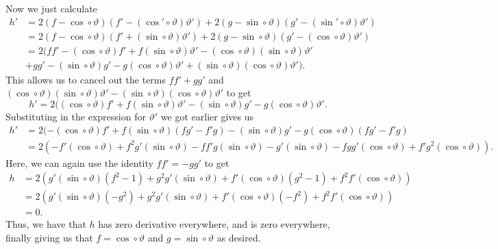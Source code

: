 \documentclass[12 pt, letterpaper]{hmcpset}
\begin{document}
\begin{solution}
	Now we just calculate
	\[
		\begin{split}
			h' & = 2 (f - \cos \circ \vartheta)(f' - (\cos' \circ \vartheta) \vartheta') + 2(g - \sin \circ \vartheta)(g' - (\sin' \circ \vartheta) \vartheta') \\
			   & = 2 (f - \cos \circ \vartheta)(f' + (\sin \circ \vartheta) \vartheta') + 2(g - \sin \circ \vartheta)(g' - (\cos \circ \vartheta) \vartheta') \\
			   & = 2 (f f' - (\cos \circ \vartheta) f' + f (\sin \circ \vartheta) \vartheta' - (\cos \circ \vartheta) (\sin \circ \vartheta) \vartheta' \\ 
			   & + g g' - (\sin \circ \vartheta) g' - g (\cos \circ \vartheta) \vartheta' + (\sin \circ \vartheta) (\cos \circ \vartheta) \vartheta').
		\end{split}
	\]
	This allows us to cancel out the terms $f f' + g g'$ and $(\cos \circ \vartheta) (\sin \circ \vartheta) \vartheta' - (\sin \circ \vartheta) (\cos \circ \vartheta) \vartheta'$ to get
	\[
		h' = 2 ((\cos \circ \vartheta) f' + f (\sin \circ \vartheta) \vartheta' - (\sin \circ \vartheta) g' - g (\cos \circ \vartheta) \vartheta'.
	\]
	Substituting in the expression for $\vartheta'$ we got earlier gives us
	\[
		\begin{split}
			h' & = 2 (-(\cos \circ \vartheta) f' + f (\sin \circ \vartheta) (f g' - f' g) - (\sin \circ \vartheta) g' - g (\cos \circ \vartheta) (f g' - f' g) \\
			   & = 2( - f' (\cos \circ \vartheta) + f^2 g' (\sin \circ \vartheta) - f f' g (\sin \circ \vartheta) - g' (\sin \circ \vartheta) - f g g' (\cos \circ \vartheta) + f' g^2 (\cos \circ \vartheta) ). 
		\end{split}
	\]
	Here, we can again use the identity $f f' = - g g'$ to get
	\[
		\begin{split}
			h & = 2 (g' (\sin \circ \vartheta) (f^2 - 1) + g^2 g' (\sin \circ \vartheta) + f' (\cos \circ \vartheta) (g^2 - 1) + f^2 f' (\cos \circ \vartheta)) \\
			  & = 2 (g' (\sin \circ \vartheta) (-g^2) + g^2 g' (\sin \circ \vartheta) + f' (\cos \circ \vartheta) (- f^2) + f^2 f' (\cos \circ \vartheta)) \\
			  & = 0.
		\end{split}
	\]
	Thus, we have that $h$ has zero derivative everywhere, and is zero everywhere, finally giving us that $f = \cos \circ \vartheta$ and $g = \sin \circ \vartheta$ as desired.
\end{solution}
\end{document}
